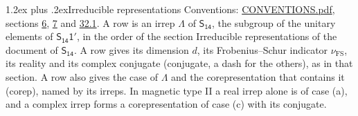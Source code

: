 \documentclass[10pt,a4paper]{article}
\makeatletter
\renewcommand\section{\@startsection{section}{1}{\z@}{-3ex plus -1ex minus -.2ex}%
  {1.2ex plus .2ex}{\normalfont\large\sffamily\bfseries\color{parttitle}}}
\numberwithin{equation}{section}
\newcommand{\grp}[1]{\mathsf{#1}}
\newcommand{\fsind}{\nu_{\mathrm{FS}}}
\makeatother
\begin{document}
\section{Irreducible representations}\label{s:irreps}
Conventions: \href{../../CONVENTIONS.pdf}{CONVENTIONS.pdf}, sections \href{../../../rotation/CONVENTIONS.pdf\#conv.6}{6}, \href{../../../rotation/CONVENTIONS.pdf\#conv.7}{7} and \href{../../CONVENTIONS.pdf\#conv.32.1}{32.1}.
\leavevmode\label{n:irrep.Delta}A row is an irrep $\Lambda$ of $\grp{S_{14}}$, the subgroup of the unitary elements of $\grp{S_{14}1'}$, in the order of the section Irreducible representations of the document of \href{../../../rotation/data/pdf/S14.pdf}{$\grp{S_{14}}$}. \label{n:index.dimension}\label{n:index.frobenius}\label{n:head.irrep}\label{n:head.reality}\label{n:head.conjugate}A row gives its dimension $d$, its Frobenius--Schur indicator $\fsind$, its reality and its complex conjugate (conjugate, a dash for the others), as in that section. \label{n:head.case.corep}\label{n:head.corep}A row also gives the case of $\Lambda$ and the corepresentation that contains it (corep), named by its irreps. In magnetic type II a real irrep alone is of case (a), and a complex irrep forms a corepresentation of case (c) with its conjugate.
\setlength{\emergencystretch}{2em}\par\setlength{\emergencystretch}{0pt}
\end{document}
